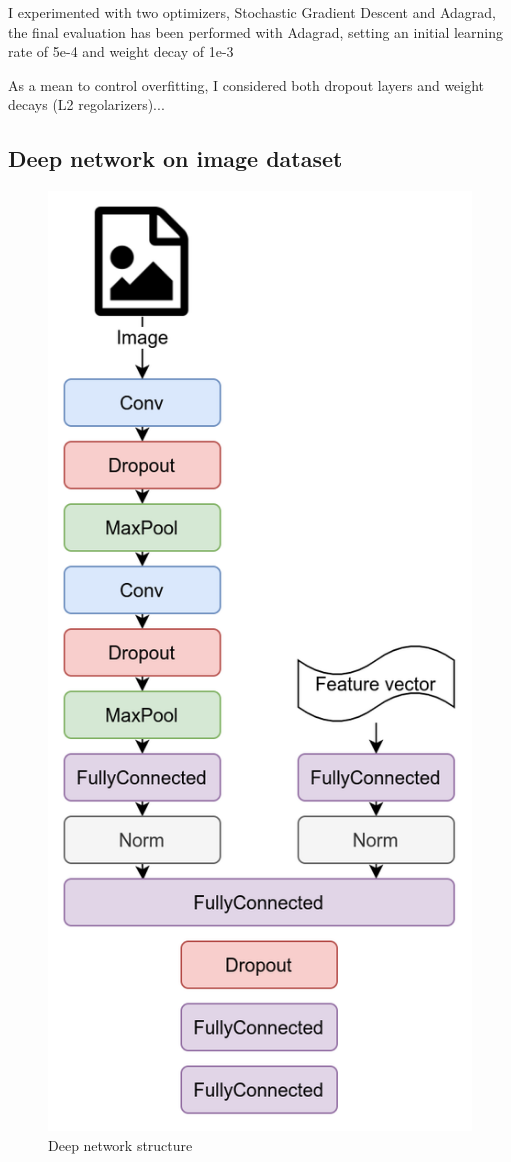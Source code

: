 \documentclass[10pt,letterpaper]{article}
\begin{document}
I experimented with two optimizers, Stochastic Gradient Descent and Adagrad, the final evaluation has been performed with Adagrad, setting an initial learning rate of 5e-4 and  weight decay of 1e-3

As a mean to control overfitting, I considered both dropout layers and weight decays (L2 regolarizers)...


\subsection{Deep network on image dataset}

\begin{figure}
\includegraphics[width=0.9\linewidth]{Network.png}
\caption{Deep network structure}
\end{figure}
\end{document}
